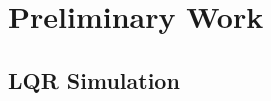 \documentclass{beamer}
\begin{document}




\section{Preliminary Work}

\subsection{LQR Simulation} %
\end{document}
